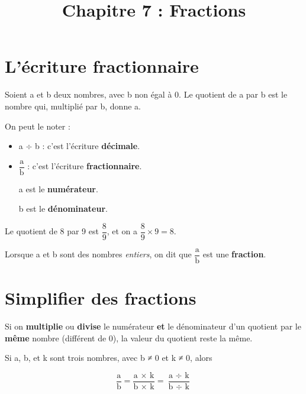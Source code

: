 \documentclass[a4paper,11pt]{article}
\title{Chapitre 7 : Fractions}
\date{}
\author{}
\begin{document}
\maketitle

\section{L'écriture fractionnaire}

\begin{cours}
	Soient a et b deux nombres, avec b non égal à 0. Le quotient de a par b est le nombre qui, multiplié par b, donne a.

	On peut le noter :
	\begin{itemize}
		\item a $÷$ b : c'est l'écriture \textbf{décimale}.
		\item $\dfrac{\text{a}}{\text{b}}$ : c'est l'écriture \textbf{fractionnaire}.

		      a est le \textbf{numérateur}.

		      b est le \textbf{dénominateur}.
	\end{itemize}
\end{cours}


\begin{exemple}
	Le quotient de 8 par 9 est $\dfrac{8}{9}$, et on a $\dfrac{8}{9} × 9 = 8$.
\end{exemple}

\begin{cours}[Fractions]
	Lorsque a et b sont des nombres \textit{entiers}, on dit que $\dfrac{\text{a}}{\text{b}}$ est une \textbf{fraction}.
\end{cours}

\section{Simplifier des fractions}

\begin{cours}
	Si on \textbf{multiplie} ou \textbf{divise} le numérateur \textbf{et} le dénominateur d'un quotient par le \textbf{même} nombre (différent de 0), la valeur du quotient reste la même.

	Si a, b, et k sont trois nombres, avec b ≠ 0 et k ≠ 0, alors

	$$ \dfrac{\text{a}}{\text{b}} = \dfrac{\text{a × k}}{\text{b × k}} = \dfrac{\text{a }÷\text{ k}}{\text{b }÷\text{ k}} $$
\end{cours}
\end{document}
